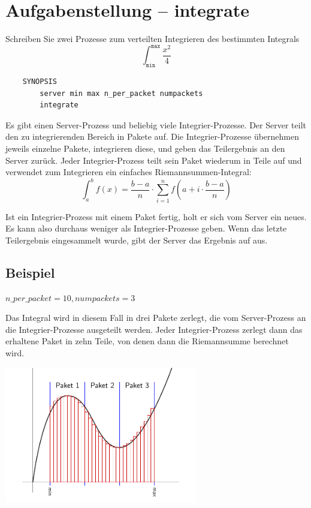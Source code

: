 

\usepackage{graphicx}




\section*{Aufgabenstellung -- integrate}

Schreiben Sie zwei Prozesse zum verteilten Integrieren des bestimmten Integrals
$$\int^{\mathtt{max}}_{\mathtt{min}} \frac{x^2}{4}$$

\begin{verbatim}
    SYNOPSIS
        server min max n_per_packet numpackets
        integrate
\end{verbatim}

Es gibt einen Server-Prozess und beliebig viele Integrier-Prozesse. Der Server
teilt den zu integrierenden Bereich in  Pakete auf. Die
Integrier-Prozesse übernehmen jeweils einzelne Pakete, integrieren diese, und
geben das Teilergebnis an den Server zurück. Jeder Integrier-Prozess teilt sein
Paket wiederum in  Teile auf und verwendet zum Integrieren
ein einfaches Riemannsummen-Integral:
$$\int^b_a f(x) = \frac{b-a}n \cdot \sum_{i=1}^{n} f\left(a + i\cdot \frac{b-a}{n}\right)$$

Ist ein Integrier-Prozess mit einem Paket fertig, holt er sich vom Server ein
neues. Es kann also durchaus weniger als  Integrier-Prozesse
geben. Wenn das letzte Teilergebnis eingesammelt wurde, gibt der Server das
Ergebnis auf  aus.

\subsection*{Beispiel}

$n\_per\_packet = 10, numpackets = 3$

Das Integral wird in diesem Fall in drei Pakete zerlegt, die vom Server-Prozess
an die Integrier-Prozesse ausgeteilt werden. Jeder Integrier-Prozess zerlegt
dann das erhaltene Paket in zehn Teile, von denen dann die Riemannsumme
berechnet wird.

\begin{center}
\includegraphics[height=6cm]{integfigure.pdf}
\end{center}

